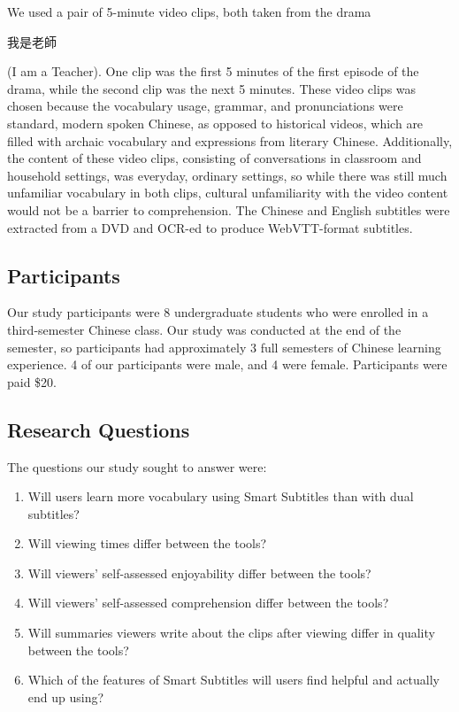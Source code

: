 \documentclass{sigchi}
\begin{document}
We used a pair of 5-minute video clips, both taken from the drama \begin{CJK}{UTF8}{min}我是老師\end{CJK} (I am a Teacher). One clip was the first 5 minutes of the first episode of the drama, while the second clip was the next 5 minutes. These video clips was chosen because the vocabulary usage, grammar, and pronunciations were standard, modern spoken Chinese, as opposed to historical videos, which are filled with archaic vocabulary and expressions from literary Chinese. Additionally, the content of these video clips, consisting of conversations in classroom and household settings, was everyday, ordinary settings, so while there was still much unfamiliar vocabulary in both clips, cultural unfamiliarity with the video content would not be a barrier to comprehension. The Chinese and English subtitles were extracted from a DVD and OCR-ed to produce WebVTT-format subtitles.

\subsection{Participants}

Our study participants were 8 undergraduate students who were enrolled in a third-semester Chinese class. Our study was conducted at the end of the semester, so participants had approximately 3 full semesters of Chinese learning experience. 4 of our participants were male, and 4 were female.
Participants were paid \$20.

\subsection{Research Questions}

The questions our study sought to answer were:

\begin{enumerate}[noitemsep]
\item Will users learn more vocabulary using Smart Subtitles than with dual subtitles?
\item Will viewing times differ between the tools?
\item Will viewers' self-assessed enjoyability differ between the tools?
\item Will viewers' self-assessed comprehension differ between the tools?
\item Will summaries viewers write about the clips after viewing differ in quality between the tools?
\item Which of the features of Smart Subtitles will users find helpful and actually end up using?
\end{enumerate}
\end{document}
